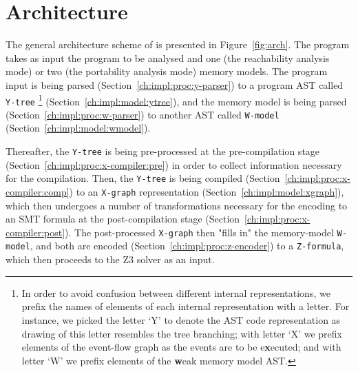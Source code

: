 \section{Architecture}
\label{ch:impl:arch}

The general architecture scheme of \porthos[2] is presented in Figure~\ref{fig:arch}.
The program takes as input the program to be analysed and one (the reachability analysis mode) or two (the portability analysis mode) memory models.
The program input is being parsed (Section~\ref{ch:impl:proc:y-parser}) to a program AST called \texttt{Y-tree}%
\footnote{In order to avoid confusion between different internal representations, we prefix the names of elements of each internal representation with a letter. For instance, we picked the letter `Y' to denote the AST code representation as drawing of this letter resembles the tree branching; with letter `X' we prefix elements of the event-flow graph as the events are to be e\textbf{x}ecuted; and with letter `W' we prefix elements of the \textbf{w}eak memory model AST.}%
(Section~\ref{ch:impl:model:ytree}), and the memory model is being parsed (Section~\ref{ch:impl:proc:w-parser}) to another AST called \texttt{W-model} (Section~\ref{ch:impl:model:wmodel}).

Thereafter, the \texttt{Y-tree} is being pre-processed at the pre-compilation stage (Section~\ref{ch:impl:proc:x-compiler:pre}) in order to collect information necessary for the compilation. Then, the \texttt{Y-tree} is being compiled (Section~\ref{ch:impl:proc:x-compiler:comp}) to an \texttt{X-graph} representation (Section~\ref{ch:impl:model:xgraph}), which then undergoes a number of transformations necessary for the encoding to an SMT formula at the post-compilation stage (Section~\ref{ch:impl:proc:x-compiler:post}).
The post-processed \texttt{X-graph} then "fills in" the memory-model \texttt{W-model}, and both are encoded (Section~\ref{ch:impl:proc:z-encoder}) to a \texttt{Z-formula}, which then proceeds to the Z3 solver as an input.


